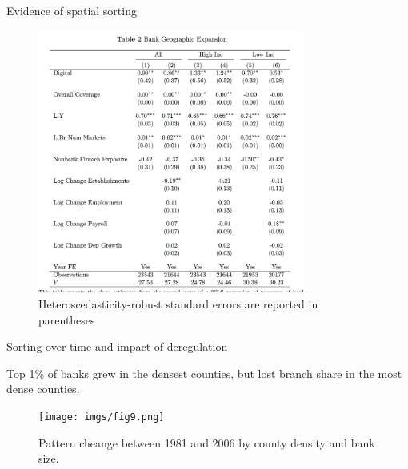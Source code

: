 \documentclass[notes,10pt, aspectratio=169]{beamer}
\newenvironment{wideitemize}{\itemize\addtolength{\itemsep}{10pt}}{\enditemize}
\begin{document}
    \begin{frame}{Evidence of spatial sorting}
    
        \begin{figure}
            \centering
            \includegraphics[width=0.78\textwidth]{imgs/tab2.png}
            \caption*{Heteroscedasticity-robust standard
            errors are reported in parentheses}
            \label{fig:my_label}
        \end{figure}
        
        \end{frame}


        \begin{frame}{Sorting over time and impact of deregulation}
            \begin{wideitemize}
                \item Top 1\% of banks grew in the densest counties, but lost branch share in the most dense counties. 
        \end{wideitemize}

    \begin{figure}
        \centering
        \texttt{[image: imgs/fig9.png]}
        \caption*{
            Pattern cheange between 1981 and 2006 by county density and bank size. }
        \label{fig:my_label}
    \end{figure}

    
    \end{frame}
\end{document}
